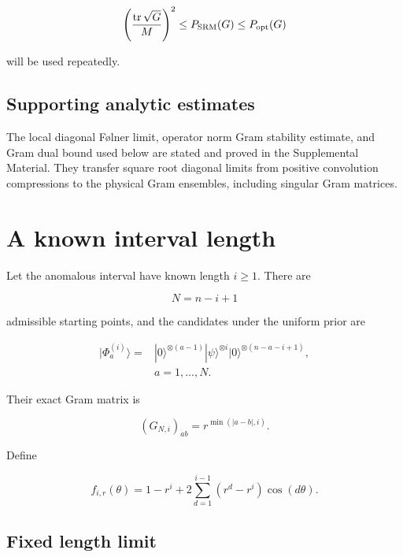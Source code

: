 \begin{equation}\label{eq:trace-srm-bound}
\left(\frac{\operatorname{tr}\sqrt G}{M}\right)^2
\le P_{\rm SRM}(G)\le P_{\rm opt}(G)
\end{equation}

will be used repeatedly.

\subsection{Supporting analytic estimates}\label{supporting-analytic-estimates}

The local diagonal Følner limit, operator norm Gram stability estimate, and
Gram dual bound used below are stated and proved in the Supplemental Material.
They transfer square root diagonal limits from positive convolution
compressions to the physical Gram ensembles, including singular Gram matrices.

\section{A known interval length}\label{a-known-interval-length}

Let the anomalous interval have known length \(i\ge1\). There are

\[
N=n-i+1
\]

admissible starting points, and the candidates under the uniform prior are

\begin{align*}
|\Phi_a^{(i)}\rangle
={}&|0\rangle^{\otimes(a-1)}|\psi\rangle^{\otimes i}
|0\rangle^{\otimes(n-a-i+1)}, \\
&a=1,\ldots,N.
\end{align*}

Their exact Gram matrix is

\begin{equation}\label{eq:fixed-gram}
(G_{N,i})_{ab}=r^{\min(|a-b|,i)}.
\end{equation}

Define

\begin{equation}\label{eq:fixed-symbol}
f_{i,r}(\theta)
=1-r^i+2\sum_{d=1}^{i-1}(r^d-r^i)\cos(d\theta).
\end{equation}

\subsection{Fixed length limit}\label{fixed-length-limit}

